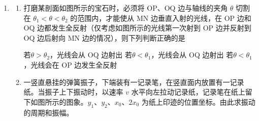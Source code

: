 \documentclass[\gkver]{gaokaozhenti}
\begin{document}
\begin{enumerate}
\begin{enumerate}
\end{enumerate}


\item
\begin{enumerate}
	\item
	打磨某剖面如图所示的宝石时，必须将 OP、OQ 边与轴线的夹角 $\theta$ 切割在 $\theta_{1}<\theta<\theta_{2}$ 的范围内，才能使从 MN 边垂直入射的光线，在 OP 边和 OQ 边都发生全反射（仅考虑如图所示的光线第一次射到 OP 边并反射到 OQ 边后射向 MN 边的情况），则下列判断正确的是


	{若$\theta>\theta_{2}$，光线会从 OQ 边射出}
	{若$\theta<\theta_{1}$，光线会从 OQ 边射出}
	{若$\theta<\theta_{1}$，光线会在 OP 边发生全反射}

	\item
	一竖直悬挂的弹簧振子，下端装有一记录笔，在竖直面内放置有一记录纸。当振子上下振动时，以速率 $v$ 水平向左拉动记录纸，记录笔在纸上留下如图所示的图象。$y_{1}$、$y_{2}$、$x_{0}$、$2x_{0}$ 为纸上印迹的位置坐标。由此求振动的周期和振幅。

\end{enumerate}

\end{enumerate}
\end{document}
